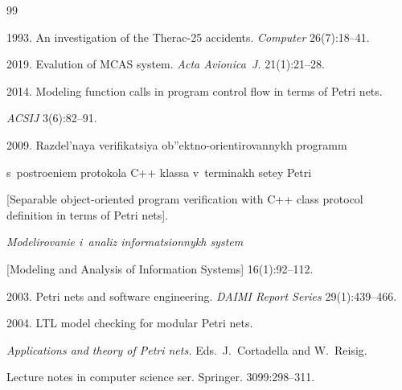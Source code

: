 {\small\frenchspacing


{%




\begin{thebibliography}{99}






 1993. An investigation of the Therac-25 accidents. \textit{Computer} 26(7):18--41.






 2019. Evalution of MCAS system. \textit{Acta Avionica~J.} 21(1):21--28.






 2014. Modeling function calls in program control flow in terms of Petri nets. 


 \textit{ACSIJ} 3(6):82--91.






 2009. Razdel'naya verifikatsiya ob''ektno-orientirovannykh pro\-gramm 


 s~po\-stro\-e\-ni\-em protokola C++ klassa v~ter\-mi\-nakh setey Petri 


 [Separable object-oriented program verification with C++ class protocol definition in terms of Petri nets]. 


 \textit{Modelirovanie i~analiz informatsionnykh system}


  [Modeling and Analysis of Information Systems] 16(1):92--112.






 2003. Petri nets and software engineering. \textit{DAIMI Report Series} 29(1):439--466.






 2004. LTL model checking for modular Petri nets. 


 \textit{Applications and theory of Petri nets.} Eds.\ J.~Cortadella and W.~Reisig.


  Lecture notes in computer science ser. Springer. 3099:298--311.



\end{thebibliography}}}

